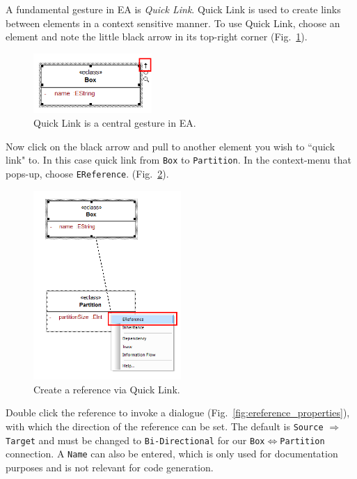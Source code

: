 A fundamental gesture in EA is \emph{Quick Link}.  Quick Link is used to create
links between elements in a context sensitive manner.  To use Quick Link,
choose an element and note the little black arrow in its top-right corner
(Fig.~\ref{fig:quicklink}). 

\begin{figure}[htbp]
	\centering
  \includegraphics[width=0.4\textwidth]{pics/memBoxBilder/memBox23.png}
	\caption{Quick Link is a central gesture in EA.} 
	\label{fig:quicklink}
\end{figure}

Now click on the black arrow and pull to another element you wish to ``quick
link" to.  In this case quick link from \texttt{Box} to \texttt{Partition}.  In
the context-menu that pops-up, choose \texttt{EReference}.
(Fig.~\ref{fig:ereference}). 

\begin{figure}[htbp] 
	\centering
  \includegraphics[width=0.5\textwidth]{pics/memBoxBilder/memBox24.png}
	\caption{Create a reference via Quick Link.}
	\label{fig:ereference}
\end{figure}

Double click the reference to invoke a dialogue (Fig.~\ref{fig:ereference_properties}), with which the
direction of the reference can be set.  The default is \texttt{Source} $\Rightarrow$ \texttt{Target} and must be changed to \texttt{Bi-Directional} for our \texttt{Box}$\Leftrightarrow$\texttt{Partition} connection.
A \texttt{Name} can also be entered, which is only used for documentation purposes and is not relevant for code generation.

